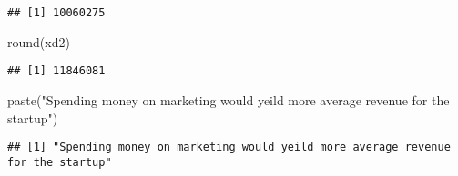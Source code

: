 \documentclass[
]{article}
\newenvironment{Shaded}{\begin{snugshade}}{\end{snugshade}}
\newcommand{\FunctionTok}[1]{\textcolor[rgb]{0.00,0.00,0.00}{#1}}
\newcommand{\NormalTok}[1]{#1}
\newcommand{\StringTok}[1]{\textcolor[rgb]{0.31,0.60,0.02}{#1}}
\begin{document}
\begin{verbatim}
## [1] 10060275
\end{verbatim}

\begin{Shaded}
\begin{Highlighting}[]
\FunctionTok{round}\NormalTok{(xd2)}
\end{Highlighting}
\end{Shaded}

\begin{verbatim}
## [1] 11846081
\end{verbatim}

\begin{Shaded}
\begin{Highlighting}[]
\FunctionTok{paste}\NormalTok{(}\StringTok{"Spending money on marketing would yeild more average revenue for the startup"}\NormalTok{)}
\end{Highlighting}
\end{Shaded}

\begin{verbatim}
## [1] "Spending money on marketing would yeild more average revenue for the startup"
\end{verbatim}
\end{document}
